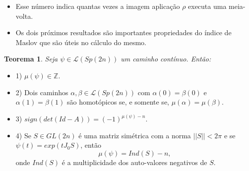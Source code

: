 \documentclass{beamer}
\newtheorem{teorema}{Teorema}[section]
\newcommand{\caminhos}{\mathcal{L}}
\newcommand{\caminhossempontobase}[1]{\caminhos(#1)}
\newcommand{\estruturacomplexa}{J_{0}}
\newcommand{\gruposimpletico}[1]{Sp(#1)}
\newcommand{\inteiros}{\mathbb{Z}}
\begin{document}
\begin{frame}
	\begin{itemize}
		\item 
		Esse número indica quantas vezes a imagem aplicação $\rho$ executa uma meia-volta.
		
		\item  Os dois próximos resultados são importantes propriedades do índice de Maslov que são úteis no cálculo do mesmo.
	\end{itemize}
	
	\begin{teorema}
		Seja $\psi\in \caminhossempontobase{\gruposimpletico{2n}} $ um caminho contínuo. Então:
	\end{teorema}
	\begin{itemize}
		
		\item 1) $\mu(\psi) \in \inteiros$.
		\item 2) Dois caminhos $\alpha, \beta \in \caminhossempontobase{\gruposimpletico{2n}} $ com $\alpha(0) = \beta(0)$ e $\alpha(1) = \beta(1)$ são homotópicos se, e somente se, $\mu(\alpha) = \mu(\beta)$.
		\item 3) $sign(det(Id - A)) = (-1)^{\mu(\psi)-n}$.
		\item 4) Se $S \in GL(2n)$ é uma matriz simétrica com a norma $||S|| < 2\pi$ e se $\psi(t) = exp(t\estruturacomplexa S)$, então 
		$$
		\mu(\psi) = Ind(S) - n,
		$$
		onde $Ind(S)$ é a multiplicidade dos auto-valores negativos de $S$.
	\end{itemize}
\end{frame}
\end{document}

